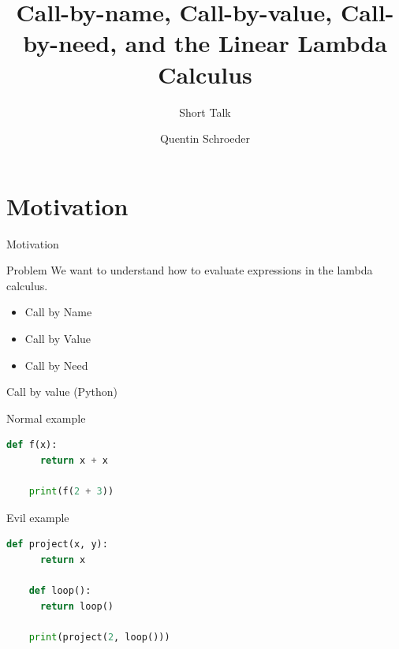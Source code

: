 \documentclass[10pt]{beamer}
\title{Call-by-name, Call-by-value, Call-by-need, and the Linear Lambda Calculus}
\subtitle{Short Talk}
\date{}
\author{Quentin Schroeder}
\institute{MPRI - Université Paris-Cité}
\begin{document}
\maketitle


\section[Idea]{Motivation}



\begin{frame}[fragile]{Motivation}
  \begin{alertblock}{Problem}
    We want to understand how to evaluate expressions in the lambda calculus.\\
  \end{alertblock}

  \begin{itemize} [<+- | alert@+>]
    \item Call by Name
    \item Call by Value
    \item Call by Need
  \end{itemize}
\end{frame}


\begin{frame}[fragile]{Call by value (Python)}
  \begin{alertblock}{Normal example}
  \begin{lstlisting}[language=Python]
    def f(x):
      return x + x

    print(f(2 + 3))
  \end{lstlisting}
  \end{alertblock}

  \pause

  \begin{alertblock}{Evil example}
  \begin{lstlisting}[language=Python]
    def project(x, y):
      return x

    def loop():
      return loop()

    print(project(2, loop()))
  \end{lstlisting}
  \end{alertblock}
\end{frame}
\end{document}
